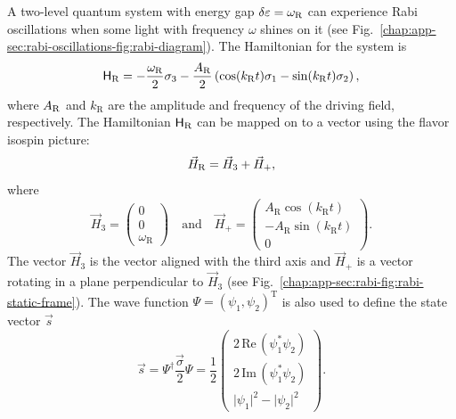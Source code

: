 A two-level quantum system with energy gap $\delta\varepsilon = \omega_{\mathrm R}$ can experience Rabi oscillations when some light with frequency $\omega$ shines on it (see Fig.~\ref{chap:app-sec:rabi-oscillations-fig:rabi-diagram}).
The Hamiltonian for the system is
\begin{equation}
    \mathsf H_{\RR} = -\frac{\omega_{\RR}}{2}\sigma_3 - \frac{A_{\RR} }{2}  \left( \cos(k_{\RR} t)\sigma_1  - \sin(k_{\RR} t) \sigma_2\right),
    \label{rabi-oscillation-single-perturbation}
\end{equation}
where $A_{\mathrm R}$ and $k_{\mathrm{R}}$ are the amplitude and frequency of the driving field, respectively. The Hamiltonian $\mathsf H_\mathrm R$ can be mapped on to a vector using the flavor isospin picture:
\begin{equation}
\vec H_{\RR} = \vec H_3 + \vec H_+,
\label{chap:matter-eqn:rabi-hamiltonian-h3-hplus}
\end{equation}
where
\begin{equation}
    \vec{H}_3 =  \begin{pmatrix}
    0 \\ 0 \\ \omega_{\mathrm R}
    \end{pmatrix} \quad \text{and} \quad
    \vec{H}_+ =  \begin{pmatrix}
    A_{\mathrm{R}} \cos(k_{\mathrm{R}} t ) \\
    - A_{\mathrm{R}} \sin(k_{\mathrm{R}} t) \\
    0
    \end{pmatrix}.
    \label{chap:app-sec:rabi-eqn:h3-and-hplus}
\end{equation}
The vector $\vec{H}_3$ is the vector aligned with the third axis and $\vec{H}_+$ is a vector rotating in a plane perpendicular to $\vec{H}_3$ (see Fig.~\ref{chap:app-sec:rabi-fig:rabi-static-frame}). The wave function $\Psi=(\psi_1,\psi_2)^{\mathrm{T}}$ is also used to define the state vector $\vec{s}$
\begin{equation}
    \vec{s} = \Psi^\dagger \frac{\vec{\sigma}}{2}\Psi
    = \frac{1}{2}\begin{pmatrix}
    2\,\mathrm{Re}\,(\psi_1^* \psi_2) \\
    2\,\mathrm{Im}\,(\psi_1^*\psi_2) \\
    \lvert \psi_1 \rvert^2 - \lvert \psi_2 \rvert^2
    \end{pmatrix}.
\end{equation}



